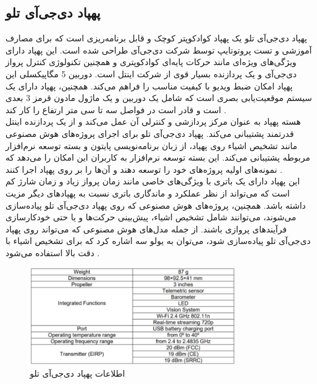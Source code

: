 \subsection{پهپاد دی‌جی‌آی تلو}
پهپاد دی‌جی‌آی تلو یک پهپاد کوادکوپتر کوچک و قابل برنامه‌ریزی است که برای مصارف آموزشی و تست پروتوتایپ توسط شرکت دی‌جی‌آی طراحی شده است. این پهپاد دارای ویژگی‌های ویژه‌ای مانند حرکات پایه‌ای کوادکوپتری و همچنین تکنولوژی 
کنترل پرواز دی‌جی‌آی و یک پردازنده بسیار قوی از شرکت اینتل است. دوربین 5 مگاپیکسلی این پهپاد امکان ضبط ویدیو با کیفیت مناسب را فراهم می‌کند. همچنین، پهپاد دارای یک سیستم موقعیت‌یابی بصری است که شامل 
یک دوربین و یک ماژول مادون قرمز 3 بعدی است و قادر است در فواصل سه تا سی متر ارتفاع  را کار کند .
\\
هسته پهپاد به عنوان مرکز پردازشی و کنترلی آن عمل می‌کند و از یک پردازنده اینتل قدرتمند پشتیبانی می‌کند. پهپاد دی‌جی‌آی تلو برای اجرای پروژه‌های هوش مصنوعی مانند تشخیص اشیاء روی پهپاد، از زبان 
برنامه‌نویسی پایتون و بسته توسعه نرم‌افزار مربوطه پشتیبانی می‌کند. این بسته توسعه نرم‌افزار به کاربران این امکان را می‌دهد که نمونه‌های اولیه پروژه‌های خود را توسعه دهند و آن‌ها را بر روی پهپاد اجرا کنند .
\\
این پهپاد دارای یک باتری با ویژگی‌های خاصی مانند زمان پرواز زیاد و زمان شارژ کم است که می‌تواند از نظر عملکرد و ماندگاری باتری نسبت به پهپاد‌های دیگر مزیت داشته باشد. همچنین، پروژه‌های هوش مصنوعی که روی پهپاد دی‌جی‌آی تلو پیاده‌سازی می‌شوند، 
می‌توانند شامل تشخیص اشیاء، پیش‌بینی حرکت‌ها و یا حتی خودکارسازی فرآیندهای پروازی باشند. از جمله مدل‌های هوش مصنوعی که می‌تواند روی پهپاد دی‌جی‌آی تلو پیاده‌سازی شود، می‌توان به یولو سه  اشاره کرد که برای تشخیص اشیاء با دقت بالا استفاده می‌شود \cite{bhujbal2022custom}.

\begin{figure}[h]
    \centering
    \includegraphics[width=0.8\textwidth]{table.png}
    \caption[طلاعات پهپاد دی‌جی‌آی تلو]{اطلاعات پهپاد دی‌جی‌آی تلو \cite{bhujbal2022custom}}
\end{figure}


